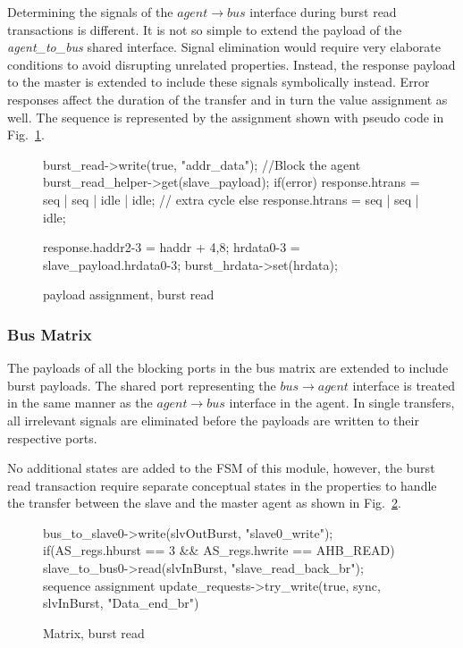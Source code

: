 Determining the signals of the $agent\rightarrow bus$ interface during burst read transactions is different. It is not so simple to extend the payload of the \textit{agent\_to\_bus} shared interface. Signal elimination would require very elaborate conditions to avoid disrupting unrelated properties. Instead, the response payload to the master is extended to include these signals symbolically instead. Error responses affect the duration of the transfer and in turn the value assignment as well. The sequence is represented by the assignment shown with pseudo code in Fig.~\ref{fig:burst-read-sequence}.   
\newpage
\begin{figure}[h!]
\begin{C++}
burst_read->write(true, "addr_data"); //Block the agent
burst_read_helper->get(slave_payload);
if(error) 
response.htrans = seq | seq | idle | idle; // extra cycle
else
response.htrans = seq | seq | idle; 

response.haddr2-3 = haddr + 4,8;   
hrdata0-3 = slave_payload.hrdata0-3;
burst_hrdata->set(hrdata); 
\end{C++}
\caption{payload assignment, burst read}
\label{fig:burst-read-sequence}
\end{figure}

\subsubsection{Bus Matrix}
The payloads of all the blocking ports in the bus matrix are extended to include burst payloads. The shared port representing the $bus\rightarrow agent$ interface is treated in the same manner as the $agent\rightarrow bus$ interface in the agent. In single transfers, all irrelevant signals are eliminated before the payloads are written to their respective ports. \par
No additional states are added to the FSM of this module, however, the burst read transaction require separate conceptual states in the properties to handle the transfer between the slave and the master agent as shown in Fig.~\ref{fig:burst-read-matrix}.
\begin{figure}[h!]
\begin{C++}
bus_to_slave0->write(slvOutBurst, "slave0_write");
 if(AS_regs.hburst == 3 && AS_regs.hwrite == AHB_READ){
 slave_to_bus0->read(slvInBurst, "slave_read_back_br");
    \\sequence assignment
 update_requests->try_write(true, sync, slvInBurst, "Data_end_br")
 }
\end{C++}
\caption{Matrix, burst read}
\label{fig:burst-read-matrix}
\end{figure}

